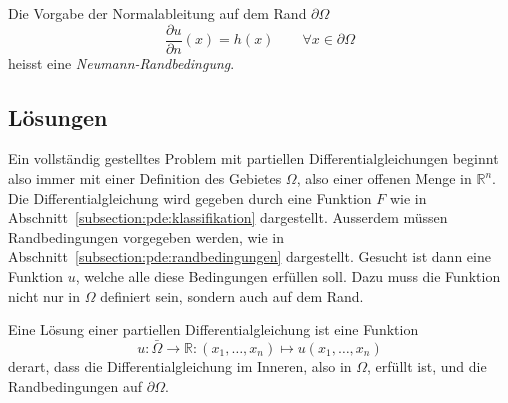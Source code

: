 \begin{definition}
Die Vorgabe der Normalableitung auf dem Rand $\partial\Omega$
\[
\frac{\partial u}{\partial n}(x) = h(x)\qquad \forall x\in\partial\Omega
\]
heisst eine {\em Neumann-Randbedingung}.
\end{definition}
%
%

\subsection{Lösungen
\label{subsection:pde:loesungen}}
Ein vollständig gestelltes Problem mit partiellen Differentialgleichungen
beginnt also immer mit einer Definition des Gebietes $\Omega$, also
einer offenen Menge in $\mathbb R^n$.
Die Differentialgleichung wird gegeben durch eine Funktion $F$ wie in
Abschnitt~\ref{subsection:pde:klassifikation} dargestellt.
Ausserdem müssen Randbedingungen vorgegeben werden, wie in
Abschnitt~\ref{subsection:pde:randbedingungen} dargestellt.
Gesucht ist dann eine Funktion $u$, welche alle diese Bedingungen
erfüllen soll.
Dazu muss die Funktion nicht nur in $\Omega$ definiert sein, 
sondern auch auf dem Rand.

\begin{definition}
Eine Lösung einer partiellen Differentialgleichung ist eine Funktion
\[
u\colon \bar{\Omega} \to \mathbb R:(x_1,\dots,x_n)\mapsto u(x_1,\dots,x_n)
\]
derart, dass die Differentialgleichung im Inneren, also in $\Omega$,
erfüllt ist, und die Randbedingungen auf $\partial\Omega$.
\end{definition}






